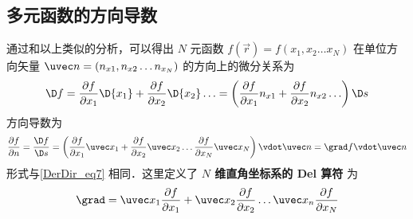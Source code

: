 \subsection{多元函数的方向导数}
通过和以上类似的分析，可以得出 $N$ 元函数 $f(\vec r) = f(x_1,x_2\dots x_N)$ 在单位方向矢量 $\uvec n = \left( {{n_{x1}},{n_{x2}}\dots{n_{x_N}}} \right)$ 的方向上的微分关系为
\begin{equation}
\D f = \frac{{\partial f}}{{\partial {x_1}}}\D {x_1} + \frac{{\partial f}}{{\partial {x_2}}}\D {x_2}\ldots = \left( {\frac{{\partial f}}{{\partial {x_1}}}{n_{x1}} + \frac{{\partial f}}{{\partial {x_2}}}{n_{x2}}\dots} \right)\D s
\end{equation}
方向导数为
\begin{equation}
\frac{{\partial f}}{{\partial n}} = \frac{\D f}{\D s} = \left( {\frac{{\partial f}}{{\partial {x_1}}}{{\uvec x}_1} + \frac{{\partial f}}{{\partial {x_2}}}{{\uvec x}_2}\ldots  \frac{{\partial f}}{{\partial {x_N}}}{{\uvec x}_N}} \right) \vdot \uvec n = \grad f \vdot \uvec n
\end{equation} 
形式与\autoref{DerDir_eq7} 相同．这里定义了\textbf{ $N$ 维直角坐标系的 Del 算符} 为
\begin{equation}
\grad  = {\uvec x_1}\frac{{\partial f}}{{\partial {x_1}}} + {\uvec x_2}\frac{{\partial f}}{{\partial {x_2}}}\dots{\uvec x_n}\frac{{\partial f}}{{\partial {x_N}}} 
\end{equation}


